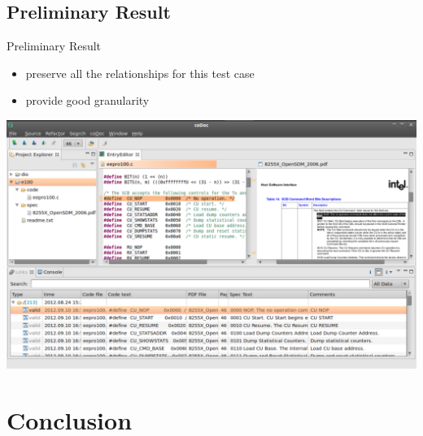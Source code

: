 \documentclass[]{beamer}
\begin{document}
\subsection{Preliminary Result}
\begin{frame}[b]{\centerline{Preliminary Result}}
  \fontsize{13.5}{11}\selectfont
  \begin{itemize}
  \item preserve all the relationships for this test case
  \item provide good granularity
  \end{itemize}
  \centerline{\includegraphics[width=.9\textwidth]{platformview}}
\end{frame}

\section{Conclusion}
\end{document}
